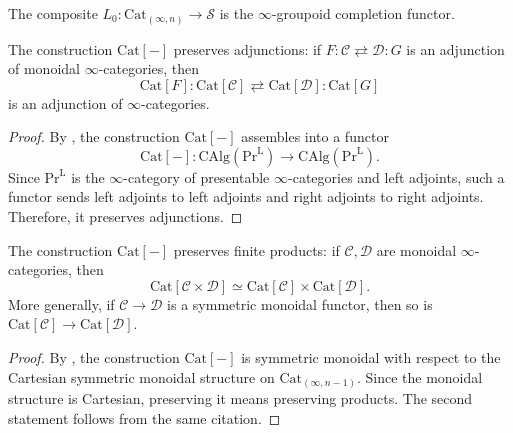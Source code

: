 \documentclass{amsart}
\begin{document}
The composite \(L_0 \colon \mathrm{Cat}_{(\infty,n)} \to \mathcal{S}\) is the $\infty$-groupoid completion functor. 

\begin{lemma}
\label{lem:Cat-preserves-adjunctions}
The construction $\mathrm{Cat}[-]$ preserves adjunctions: if $F \colon \mathcal{C} \rightleftarrows \mathcal{D} \colon G$ is an adjunction of monoidal $\infty$-categories, then
\[
\mathrm{Cat}[F] \colon \mathrm{Cat}[\mathcal{C}] \rightleftarrows \mathrm{Cat}[\mathcal{D}] \colon \mathrm{Cat}[G]
\]
is an adjunction of $\infty$-categories.
\end{lemma}


\begin{proof}
By \cite[Proposition 5.7.8 and Proposition 5.7.16]{GH19}, the construction $\mathrm{Cat}[-]$ assembles into a functor
\[
\mathrm{Cat}[-] \colon \mathrm{CAlg}(\mathrm{Pr}^{\mathrm{L}}) \to \mathrm{CAlg}(\mathrm{Pr}^{\mathrm{L}}).
\]
Since $\mathrm{Pr}^{\mathrm{L}}$ is the $\infty$-category of presentable $\infty$-categories and left adjoints, such a functor sends left adjoints to left adjoints and right adjoints to right adjoints. Therefore, it preserves adjunctions.
\end{proof}


\begin{lemma}
\label{lem:Cat-preserves-products}
The construction $\mathrm{Cat}[-]$ preserves finite products: if $\mathcal{C}, \mathcal{D}$ are monoidal $\infty$-categories, then
\[
\mathrm{Cat}[\mathcal{C} \times \mathcal{D}] \simeq \mathrm{Cat}[\mathcal{C}] \times \mathrm{Cat}[\mathcal{D}].
\]
More generally, if $\mathcal{C} \to \mathcal{D}$ is a symmetric monoidal functor, then so is $\mathrm{Cat}[\mathcal{C}] \to \mathrm{Cat}[\mathcal{D}]$.
\end{lemma}

\begin{proof}
By \cite[Proposition 5.7.16]{GH19}, the construction $\mathrm{Cat}[-]$ is symmetric monoidal with respect to the Cartesian symmetric monoidal structure on $\mathrm{Cat}_{(\infty,n-1)}$. Since the monoidal structure is Cartesian, preserving it means preserving products. The second statement follows from the same citation.
\end{proof}
\end{document}
